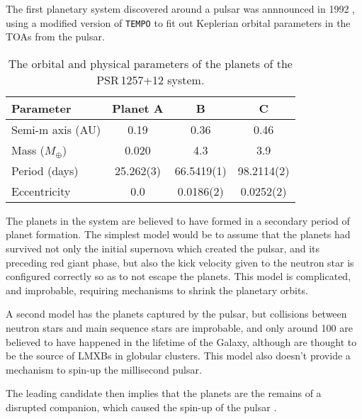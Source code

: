 The first planetary system discovered around a pulsar was annnounced
in 1992 \cite{1992Natur.355..145W}, using a modified version of
\texttt{TEMPO} to fit out Keplerian orbital parameters in the TOAs
from the pulsar.
\begin{table}[b]
  \centering
  \begin{tabular}{l ccc}
\toprule
    Parameter        & Planet A  & B          & C          \\
\midrule
Semi-m axis (AU) & 0.19      & 0.36       & 0.46       \\
Mass ($M_{\oplus}$)  & 0.020     & 4.3        & 3.9        \\
Period (days)        & 25.262(3) & 66.5419(1) & 98.2114(2) \\
Eccentricity         & 0.0       & 0.0186(2)  & 0.0252(2)\\
\bottomrule
  \end{tabular}
  \caption{The orbital and physical parameters of the planets of the PSR\,1257+12 system. \cite{2003ApJ...591L.147K}}
  \label{tab:pulsar-planets}
\end{table}
The planets in the system are believed to have formed in a secondary
period of planet formation. The simplest model would be to assume that
the planets had survived not only the initial supernova which created
the pulsar, and its preceding red giant phase, but also the kick
velocity given to the neutron star is configured correctly so as to
not escape the planets. This model is complicated, and improbable,
requiring mechanisms to shrink the planetary orbits.

A second model has the planets captured by the pulsar, but collisions
between neutron stars and main sequence stars are improbable, and only
around 100 are believed to have happened in the lifetime of the
Galaxy, although are thought to be the source of LMXBs in globular
clusters. This model also doesn't provide a mechanism to spin-up the
millisecond pulsar.

The leading candidate then implies that the planets are the remains of
a disrupted companion, which caused the spin-up of the pulsar
\cite{1993ASPC...36..149P}.

